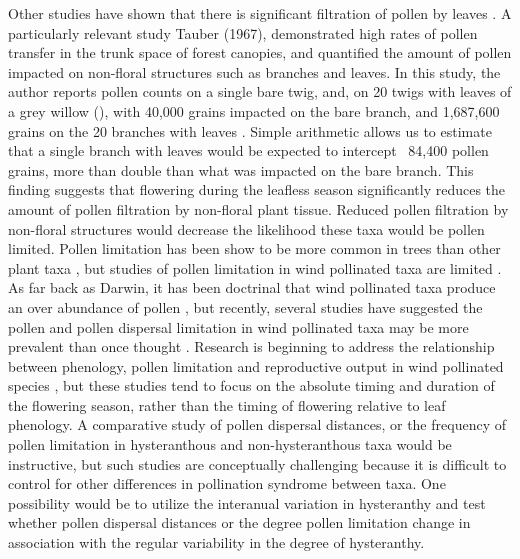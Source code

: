 \documentclass{article}\usepackage[]{graphicx}\usepackage[]{color}
\begin{document}
\indent Other studies have shown that there is significant filtration of pollen by leaves \citep{Milleron2012, Tauber1967}. A particularly relevant study Tauber (1967), demonstrated high rates of pollen transfer in the trunk space of forest canopies, and quantified the amount of pollen impacted on non-floral structures such as branches and leaves. In this study, the author reports pollen counts on a single bare twig, and, on 20 twigs with leaves of a grey willow (), with 40,000 grains impacted on the bare branch, and 1,687,600 grains on the 20 branches with leaves \citep{Tauber1967: Table IV}. Simple arithmetic allows us to estimate that a single branch with leaves would be expected to intercept ~84,400 pollen grains, more than double than what was impacted on the bare branch. This finding suggests that flowering during the leafless season significantly reduces the amount of pollen filtration by non-floral plant tissue. Reduced pollen filtration by non-floral structures would decrease the likelihood these taxa would be pollen limited. Pollen limitation has been show to be more common in trees than other plant taxa \citep{Larson2000}, but studies of pollen limitation in wind pollinated taxa are limited \citep{Knight2005}. As far back as Darwin, it has been doctrinal that wind pollinated taxa produce an over abundance of pollen \citep{Friedman2009}, but recently, several studies have suggested the pollen and pollen dispersal limitation in wind pollinated taxa may be more prevalent than once thought \citep{Koenig2003}. Research is beginning to address the relationship between phenology, pollen limitation and reproductive output in wind pollinated species \citep{Koenig2012, Koenig2015,Bogdziewicz2017}, but these studies tend to focus on the absolute timing and duration of the flowering season, rather than the timing of flowering relative to leaf phenology. A comparative study of pollen dispersal distances, or the frequency of pollen limitation in hysteranthous and non-hysteranthous taxa would be instructive, but such studies are conceptually challenging because it is difficult to control for other differences in pollination syndrome between taxa. One possibility would be to utilize the interanual variation in hysteranthy and test whether pollen dispersal distances or the degree pollen limitation change in association with the regular variability in the degree of hysteranthy. \\
\end{document}
